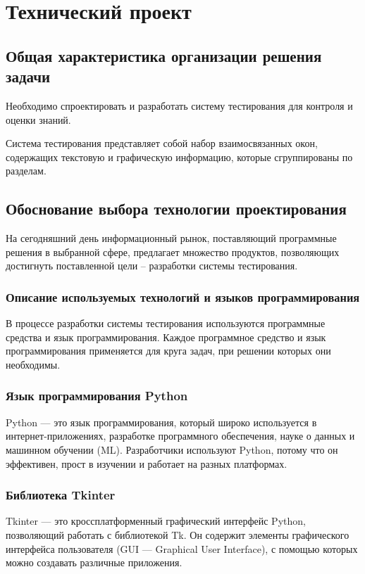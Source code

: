 \section{Технический проект}
\subsection{Общая характеристика организации решения задачи}

Необходимо спроектировать и разработать систему тестирования для контроля и оценки знаний.

Система тестирования представляет собой набор взаимосвязанных окон, содержащих текстовую и графическую информацию, которые сгруппированы по разделам. 

\subsection{Обоснование выбора технологии проектирования}

На сегодняшний день информационный рынок, поставляющий программные решения в выбранной сфере, предлагает множество продуктов, позволяющих достигнуть поставленной цели – разработки системы тестирования.

\subsubsection{Описание используемых технологий и языков программирования}

В процессе разработки системы тестирования используются программные средства и язык программирования. Каждое программное средство и язык программирования применяется для круга задач, при решении которых они необходимы.

\subsubsection{Язык программирования Python}

Python — это язык программирования, который широко используется в интернет-приложениях, разработке программного обеспечения, науке о данных и машинном обучении (ML). Разработчики используют Python, потому что он эффективен, прост в изучении и работает на разных платформах.

\subsubsection{Библиотека Tkinter}
Tkinter — это кроссплатформенный графический интерфейс Python, позволяющий работать с библиотекой Tk. Он содержит элементы графического интерфейса пользователя (GUI — Graphical User Interface), с помощью которых можно создавать различные приложения.

